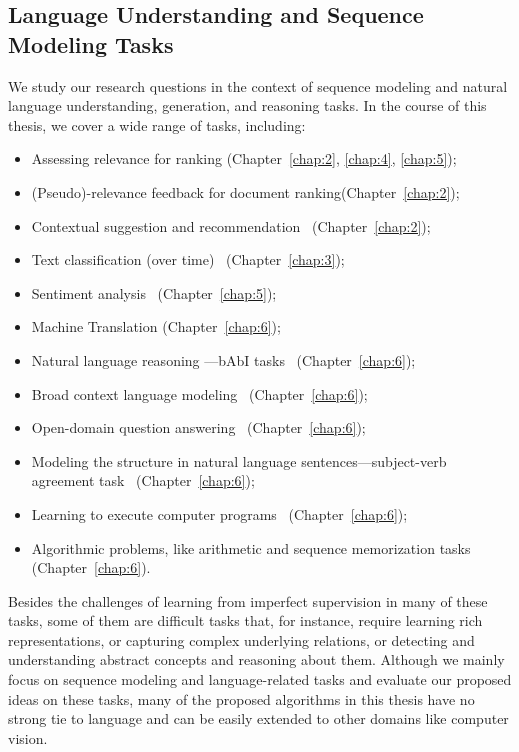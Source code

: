 \subsection{Language Understanding and Sequence Modeling Tasks}
We study our research questions in the context of sequence modeling and natural language understanding, generation, and reasoning tasks. In the course of this thesis, we cover a wide range of tasks, including:
\begin{itemize}
\item 
Assessing relevance for ranking (Chapter~\ref{chap:2}, \ref{chap:4}, \ref{chap:5});
%
\item 
(Pseudo)-relevance feedback for document ranking(Chapter~\ref{chap:2});
%
\item 
Contextual suggestion and recommendation~\citep{hashemioverview} (Chapter~\ref{chap:2});
%
\item 
Text classification (over time)~\citep{Hirst:2014} (Chapter~\ref{chap:3});
%
\item 
Sentiment analysis~\citep{rosenthal2017semeval, Nakov:2016, rosenthal:2015} (Chapter~\ref{chap:5}); 
%
\item 
Machine Translation (Chapter~\ref{chap:6});
%
\item 
Natural language reasoning ---bAbI tasks~\citep{weston2015towards} (Chapter~\ref{chap:6});
%
\item 
Broad context language modeling~\citep{paperno2016lambada} (Chapter~\ref{chap:6});
%
\item 
Open-domain question answering~\citep{dunn2017searchqa, dhingra2017quasar} (Chapter~\ref{chap:6});
%
\item 
Modeling the structure in natural language sentences---subject-verb agreement task~\citep{linzen2016assessing} (Chapter~\ref{chap:6});
%
\item 
Learning to execute computer programs~\citep{ZS14} (Chapter~\ref{chap:6}); 
%
\item 
Algorithmic problems, like arithmetic and sequence memorization tasks ~\citep{neural_gpu} (Chapter~\ref{chap:6}).
\end{itemize}

Besides the challenges of learning from imperfect supervision in many of these tasks, some of them are difficult tasks that, for instance, require learning rich representations, or capturing complex underlying relations, or detecting and understanding abstract concepts and reasoning about them.
%
Although we mainly focus on sequence modeling and language-related tasks and evaluate our proposed ideas on these tasks, many of the proposed algorithms in this thesis have no strong tie to language and can be easily extended to other domains like computer vision.
%

